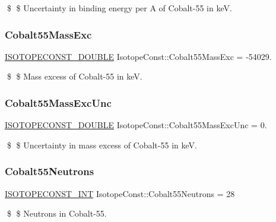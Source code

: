 \$ \$ Uncertainty in binding energy per A of Cobalt-\/55 in keV. \mbox{\label{group___isotope_const-_cobalt-_co55_gae88e0d106d43852840bcaa8a8314bf8b}} 
\subsubsection{\texorpdfstring{Cobalt55\+Mass\+Exc}{Cobalt55MassExc}}
{\footnotesize\ttfamily \mbox{\hyperlink{group___isotope_const-_macros_ga8f45a7272ce02c0b4c65c44636ed719a}{I\+S\+O\+T\+O\+P\+E\+C\+O\+N\+S\+T\+\_\+\+D\+O\+U\+B\+LE}} Isotope\+Const\+::\+Cobalt55\+Mass\+Exc = -\/54029.}

\$ \$ Mass excess of Cobalt-\/55 in keV. \mbox{\label{group___isotope_const-_cobalt-_co55_ga5ee5251dad205d47233af94d96363ab4}} 
\subsubsection{\texorpdfstring{Cobalt55\+Mass\+Exc\+Unc}{Cobalt55MassExcUnc}}
{\footnotesize\ttfamily \mbox{\hyperlink{group___isotope_const-_macros_ga8f45a7272ce02c0b4c65c44636ed719a}{I\+S\+O\+T\+O\+P\+E\+C\+O\+N\+S\+T\+\_\+\+D\+O\+U\+B\+LE}} Isotope\+Const\+::\+Cobalt55\+Mass\+Exc\+Unc = 0.}

\$ \$ Uncertainty in mass excess of Cobalt-\/55 in keV. \mbox{\label{group___isotope_const-_cobalt-_co55_gae834a1305e4e55b631e95e3d665d5822}} 
\subsubsection{\texorpdfstring{Cobalt55\+Neutrons}{Cobalt55Neutrons}}
{\footnotesize\ttfamily \mbox{\hyperlink{group___isotope_const-_macros_ga5f18360b3e99483a35c32d789e62621c}{I\+S\+O\+T\+O\+P\+E\+C\+O\+N\+S\+T\+\_\+\+I\+NT}} Isotope\+Const\+::\+Cobalt55\+Neutrons = 28}

\$ \$ Neutrons in Cobalt-\/55. \mbox{\label{group___isotope_const-_cobalt-_co55_ga7a2118d5ed140cf25a6137fe45f10246}} 
